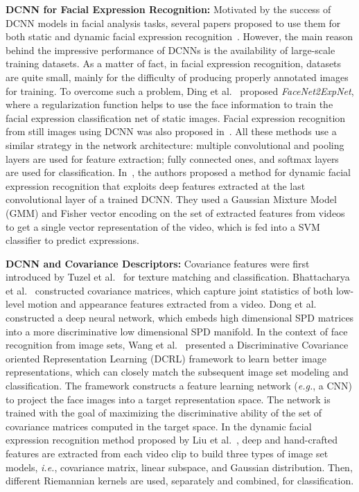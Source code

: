 \documentclass{bmvc2k}
\begin{document}
\textbf{DCNN for Facial Expression Recognition:} Motivated by the success of DCNN models in facial analysis tasks, several papers proposed to use them for both static and dynamic facial expression recognition~\cite{jung2015joint,Zafeiriou2017,mollahosseini2016going,ng2015deep}. 
However, the main reason behind the impressive performance of DCNNs is the availability of large-scale training datasets. As a matter of fact, in facial expression recognition, datasets are quite small, mainly for the difficulty of producing properly annotated images for training. 
To overcome such a problem, Ding et al.~\cite{ding2017facenet2expnet} proposed \textit{FaceNet2ExpNet}, where a regularization function helps to use the face information to train the facial expression classification net of static images. Facial expression recognition from still images using DCNN was also proposed in~\cite{mollahosseini2016going,ng2015deep,yu2015image}. All these methods use a similar strategy in the network architecture: multiple convolutional and pooling layers are used for feature extraction; fully connected ones, and softmax layers are used for classification. In~\cite{ofodile2017automatic}, the authors proposed a method for dynamic facial expression recognition that exploits deep features extracted at the last convolutional layer of a trained DCNN. They used a Gaussian Mixture Model (GMM) and Fisher vector encoding on the set of extracted features from videos to get a single vector representation of the video, which is fed into a SVM classifier to predict expressions. 

\textbf{DCNN and Covariance Descriptors:} Covariance features were first introduced by Tuzel et al.~\cite{tuzel:2006} for texture matching and classification. Bhattacharya et al.~\cite{bhattacharya:2016} constructed covariance matrices, which capture joint statistics of both low-level motion and appearance features extracted from a video. 
Dong et al.~\cite{dong2017deep} constructed a deep neural network, which embeds high dimensional SPD matrices into a more discriminative low dimensional SPD manifold. 
 In the context of face recognition from image sets, Wang et al.~\cite{wang2017discriminative} presented a Discriminative Covariance oriented Representation Learning (DCRL) framework to learn better image representations, which can closely match the subsequent image set modeling and classification. The framework constructs a feature learning network (\emph{e.g.}, a CNN) to project the face images into a target representation space. The network is trained with the goal of maximizing the discriminative ability of the set of covariance matrices computed in the target space. 
 In the dynamic facial expression recognition method proposed by Liu et al.~\cite{liu2014combining}, deep and hand-crafted features are extracted from each video clip to build three types of image set models, \emph{i.e.}, covariance matrix, linear subspace, and Gaussian distribution. Then, different Riemannian kernels are used, separately and combined, for classification.
\end{document}
